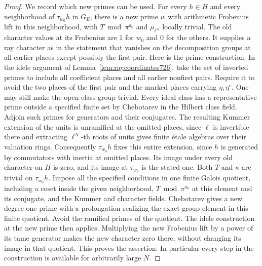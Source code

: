 \documentclass[a4paper,11pt]{article}
\theoremstyle{definition}
\theoremstyle{remark}
\numberwithin{equation}{section}
\begin{document}
\begin{proof}
We record which new primes can be used. For every \(h\in H\) and
every neighborhood of \(\tau_{w_0}h\) in \(G_E\), there is a new
prime \(w\) with arithmetic Frobenius lift in this neighborhood,
with \(T\bmod\pi^{a_0}\) and \(\mu_{\ell^N}\) locally trivial.
The old character values at its Frobenius are \(1\) for \(w_0\)
and \(0\) for the others. It supplies a ray character as in the
statement that vanishes on the decomposition groups at all earlier
places except possibly the first pair.
Here is the prime construction. In the idele argument of
Lemma~\ref{lem:raycoordinates726}, take the set of inverted primes
to include all coefficient places and all earlier nonfirst pairs.
Require it to avoid the two places of the first pair and the marked
places carrying \(\eta,\eta^c\). One may still make the open class
group trivial. Every ideal class has a representative prime outside
a specified finite set by Chebotarev in the Hilbert class field.
Adjoin such primes for generators and their conjugates. The resulting
Kummer extension of the units is unramified at the omitted places, since \(\ell\) is invertible there and extracting \(\ell^N\)-th roots of
units gives finite étale algebras over their valuation rings.
Consequently \(\tau_{w_0}h\) fixes this entire extension, since
\(h\) is generated by commutators with inertia at omitted places.
Its image under every old character on \(H\) is zero, and its image at
\(\tau_{w_0}\) is the stated one. Both \(T\) and \(\kappa\) are
trivial on \(\tau_{w_0}h\). Impose all the specified conditions
in one finite Galois quotient, including a coset inside the given
neighborhood, \(T\bmod\pi^{a_0}\) at this element and its conjugate,
and the Kummer and character fields. Chebotarev gives a new
degree-one prime with a prolongation realizing the exact group element
in this finite quotient. Avoid the ramified primes of the quotient.
The idele construction at the new prime then applies. Multiplying the
new Frobenius lift by a power of its tame generator makes the new
character zero there, without changing its image in that quotient.
This proves the assertion. In particular every step in the construction
is available for arbitrarily large \(N\).


\end{proof}
\end{document}
